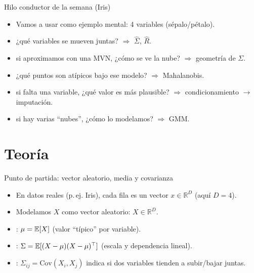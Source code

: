 \begin{frame}{Hilo conductor de la semana (Iris)}
\begin{itemize}
  \item Vamos a usar  como ejemplo mental: 4 variables (sépalo/pétalo).
  \item {} ¿qué variables se mueven juntas? \(\Rightarrow\) \(\hat{\Sigma}\), \(\hat{R}\).
  \item {} si aproximamos con una MVN, ¿cómo se ve la nube? \(\Rightarrow\) geometría de \(\Sigma\).
  \item {} ¿qué puntos son atípicos bajo ese modelo? \(\Rightarrow\) Mahalanobis.
  \item {} si falta una variable, ¿qué valor es más plausible? \(\Rightarrow\) condicionamiento \(\rightarrow\) imputación.
  \item {} si hay varias “nubes”, ¿cómo lo modelamos? \(\Rightarrow\) GMM.
\end{itemize}
\end{frame}

\section[Teoría]{Teoría\label{sec:teoria}}

\begin{frame}{Punto de partida: vector aleatorio, media y covarianza}
\begin{itemize}
  \item En datos reales (p.\,ej. Iris), cada fila es un vector \(x\in\mathbb{R}^D\) (aquí \(D=4\)).
  \item Modelamos \(X\) como vector aleatorio: \(X\in\mathbb{R}^D\).
  \item {}: \(\mu=\mathbb{E}[X]\) (valor “típico” por variable).
  \item {}: \(\Sigma=\mathbb{E}[(X-\mu)(X-\mu)^\top]\) (escala y dependencia lineal).
  \item {}: \(\Sigma_{ij}=\mathrm{Cov}(X_i,X_j)\) indica si dos variables tienden a subir/bajar juntas.
\end{itemize}
\end{frame}

